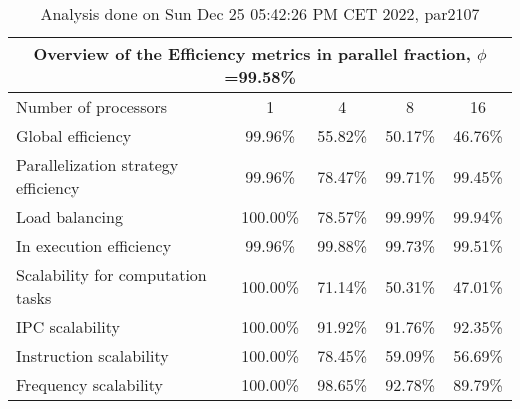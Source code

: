 \begin{table}[h]
\begin{center}
\begin{tabular}{|l|c|c|c|c|}
\hline
\multicolumn{5}{|c|}{Overview of the Efficiency metrics in parallel fraction, $\phi$=99.58\%} \\
\hline
\hline
Number of processors & 1 & 4 & 8 & 16 \\
\hline
\hline
Global efficiency                      &     99.96\% &     55.82\% &     50.17\% &     46.76\% \\
\hline
\hline
Parallelization strategy efficiency &     99.96\% &     78.47\% &     99.71\% &     99.45\% \\
\hline
Load balancing                   &    100.00\% &     78.57\% &     99.99\% &     99.94\% \\
In execution efficiency          &     99.96\% &     99.88\% &     99.73\% &     99.51\% \\
\hline
\hline
Scalability for computation tasks   &    100.00\% &     71.14\% &     50.31\% &     47.01\% \\
\hline
IPC scalability                  &    100.00\% &     91.92\% &     91.76\% &     92.35\% \\
Instruction scalability          &    100.00\% &     78.45\% &     59.09\% &     56.69\% \\
Frequency scalability            &    100.00\% &     98.65\% &     92.78\% &     89.79\% \\
\hline
\end{tabular}
\end{center}
\caption{ Analysis done on Sun Dec 25 05:42:26 PM CET 2022, par2107}
\end{table}
